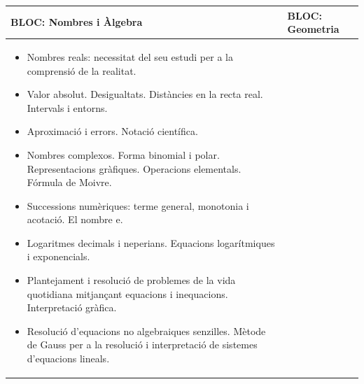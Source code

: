 \pagebreak


\dominitoc

\tableofcontents


\newpage



\begin{center}
	\fontsize{10.1}{13}\selectfont
	\leftmargin=0pt \itemindent=0pt 
	\begin{tabular}{|p{}|p{}|} \hline
		
		\rowcolor{lightgray} \textbf{BLOC: Nombres i Àlgebra} & \textbf{BLOC: Geometria} \\ \hline
		
		
		\begin{itemize}
			
			\item Nombres reals: necessitat del seu estudi per a la comprensió de la realitat. 
			
			\item Valor absolut. Desigualtats. Distàncies en la recta real. Intervals i entorns. 
			
			\item Aproximació i errors. Notació científica.
			
			\item Nombres complexos. Forma binomial i polar. Representacions gràfiques. Operacions elementals. Fórmula de Moivre.
			
			\item Successions numèriques: terme general, monotonia i acotació. El nombre e.
			
			\item Logaritmes decimals i neperians. Equacions logarítmiques i exponencials.
			
			\item Plantejament i resolució de problemes de la vida quotidiana mitjançant equacions i inequacions. Interpretació gràfica.
			
			\item Resolució d’equacions no algebraiques senzilles.
			Mètode de Gauss per a la resolució i interpretació de sistemes d’equacions lineals.
		\end{itemize}
		
		&
		
		\begin{itemize}
			

\end{itemize}
\end{tabular}
\end{center}
